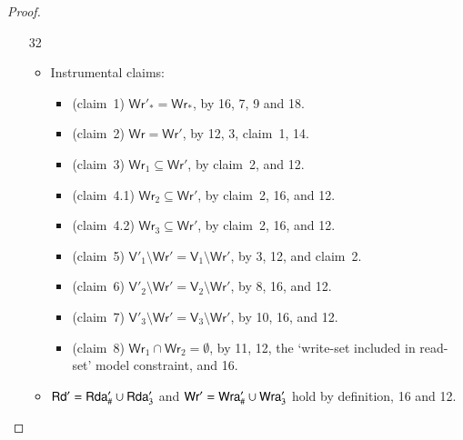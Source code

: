 \documentclass{llncs}
\newcommand{\readset}{\mathsf{Rd}}
\newcommand{\valuset}{\mathsf{V}}
\newcommand{\writeset}{\mathsf{Wr}}
\begin{document}
\begin{proof}
\begin{itemize}
\begin{itemize}
  \item[32]
    \begin{itemize}
    \item Instrumental claims:
      \begin{itemize}
  \item(claim~1) $\writeset'_* = \writeset_*$, by 16, 7, 9 and 18.
  \item(claim~2) $\writeset = \writeset'$, by 12, 3, claim~1, 14.
  \item(claim~3) $\writeset_1 \subseteq \writeset'$, by claim~2, and 12.
  \item(claim~4.1) $\writeset_2 \subseteq \writeset'$, by claim~2, 16, and 12.
  \item(claim~4.2) $\writeset_3 \subseteq \writeset'$, by claim~2, 16, and 12.    
  \item(claim~5) $\valuset'_1 \setminus \writeset' = \valuset_1 \setminus \writeset'$, by 3, 12, and claim~2.
  \item(claim~6) $\valuset'_2 \setminus \writeset' = \valuset_2 \setminus \writeset'$, by 8, 16, and 12.
  \item(claim~7) $\valuset'_3 \setminus \writeset' = \valuset_3 \setminus \writeset'$, by 10, 16, and 12.
  \item(claim~8) $\writeset_1 \cap \writeset_2 = \emptyset$, by 11, 12, the `write-set included in read-set' model constraint, and 16.
      \end{itemize}
    \item $\readset' = \readseta'_\# \cup \readseta'_3$ and $\writeset' = \writeseta'_\# \cup \writeseta'_3$ hold by definition, 16 and 12. 


\end{itemize}
\end{itemize}
\end{itemize}
\end{proof}
\end{document}
